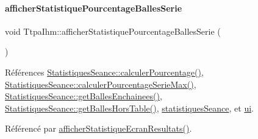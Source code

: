 \paragraph{\texorpdfstring{afficher\+Statistique\+Pourcentage\+Balles\+Serie}{afficherStatistiquePourcentageBallesSerie}}
{\footnotesize\ttfamily void Ttpa\+Ihm\+::afficher\+Statistique\+Pourcentage\+Balles\+Serie (\begin{DoxyParamCaption}{ }\end{DoxyParamCaption})\hspace{0.3cm}{\ttfamily [slot]}}



Références \hyperlink{class_statistiques_seance_a67759edd6c296bd6b66f7860dbac130e}{Statistiques\+Seance\+::calculer\+Pourcentage()}, \hyperlink{class_statistiques_seance_ad042b683ce7b4db507a443b1b27bfef8}{Statistiques\+Seance\+::calculer\+Pourcentage\+Serie\+Max()}, \hyperlink{class_statistiques_seance_a1f241d7ef584ebffa2246134c63be53b}{Statistiques\+Seance\+::get\+Balles\+Enchainees()}, \hyperlink{class_statistiques_seance_a26b717d40065e7afd80465458f3cb6aa}{Statistiques\+Seance\+::get\+Balles\+Hors\+Table()}, \hyperlink{class_ttpa_ihm_abed6897d6f7b4d3a5eb8dcc07651e740}{statistiques\+Seance}, et \hyperlink{class_ttpa_ihm_ad5fae1222a667da158c26f3d0f0dce23}{ui}.



Référencé par \hyperlink{class_ttpa_ihm_aa480a02532144d0f99af027b5b201ae1}{afficher\+Statistique\+Ecran\+Resultats()}.


